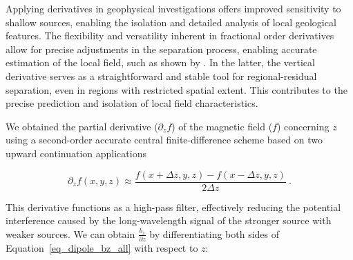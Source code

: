 Applying derivatives in geophysical investigations offers improved sensitivity to shallow sources, enabling the isolation and detailed analysis of local geological features. The flexibility and versatility inherent in fractional order derivatives allow for precise adjustments in the separation process, enabling accurate estimation of the local field, such as shown by \citet{Florio2022}. In the latter, the vertical derivative serves as a straightforward and stable tool for regional-residual separation, even in regions with restricted spatial extent. This contributes to the precise prediction and isolation of local field characteristics. 

We obtained the partial derivative ($\partial_z f$) of the magnetic field ($f$) concerning $z$ using a second-order accurate central finite-difference scheme based on two upward continuation applications

\begin{equation}
\partial_z f(x, y, z) \approx
\dfrac{f(x + \Delta z, y, z) - f(x - \Delta z, y, z)}{2 \Delta z}
\ .
\end{equation}

This derivative functions as a high-pass filter, effectively reducing the potential interference caused by the long-wavelength signal of the stronger source with weaker sources. We can obtain \( \frac{b_z}{\partial z} \) by differentiating both sides of Equation~\ref{eq_dipole_bz_all} with respect to \( z \):



